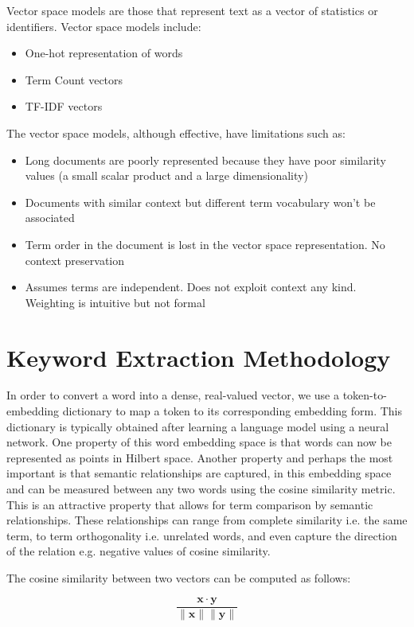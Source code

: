 \documentclass[12pt]{article}
\begin{document}
Vector space models are those that represent text as a vector of statistics or identifiers. Vector space models include:
\begin{itemize}
  \item One-hot representation of words
  \item Term Count vectors
  \item TF-IDF vectors
\end{itemize}
The vector space models, although effective, have limitations such as:
\begin{itemize}
  \item Long documents are poorly represented because they have poor similarity values (a small scalar product and a large dimensionality)
  \item Documents with similar context but different term vocabulary won't be associated
  \item Term order in the document is lost in the vector space representation. No context preservation
  \item Assumes terms are independent. Does not exploit context any kind. Weighting is intuitive but not formal
\end{itemize}


\section{Keyword Extraction Methodology}

In order to convert a word into a dense, real-valued vector, we use a token-to-embedding dictionary to map a token to its corresponding embedding form.
This dictionary is typically obtained after learning a language model using a neural network. One property of this word embedding space is that
words can now be represented as points in Hilbert space. Another property and perhaps the most important is that semantic relationships are captured,
in this embedding space and can be measured between any two words using the cosine similarity metric. This is an attractive property that
allows for term comparison by semantic relationships. These relationships can range from complete similarity i.e. the same term, to term orthogonality
i.e. unrelated words, and even capture the direction of the relation e.g. negative values of cosine similarity.

The cosine similarity between two vectors can be computed as follows:

\[
  \frac{\mathbf{x} \cdot \mathbf{y}}{\lVert \mathbf{x} \rVert \lVert \mathbf{y} \rVert}
\]
\end{document}
